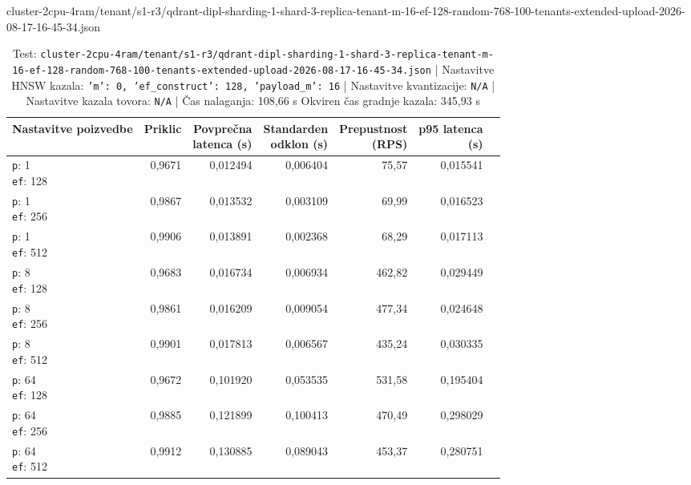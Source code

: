 \begin{table}[htbp]
  \centering
\small
  \caption{cluster-2cpu-4ram/tenant/s1-r3/qdrant-dipl-sharding-1-shard-3-replica-tenant-m-16-ef-128-random-768-100-tenants-extended-upload-2026-08-17-16-45-34.json}
  \label{tab:cluster-2cpu-4ram:tenant:s1-r3:qdrant-dipl-sharding-1-shard-3-replica-tenant-m-16-ef-128-random-768-100-tenants-extended-upload-2026-08-17-16-45-34.json}
  \begin{tabularx}{\textwidth}{Xrrrrrr}
    \toprule
    Nastavitve poizvedbe & Priklic & \makecell{Povprečna\\latenca (s)} & \makecell{Standarden\\odklon (s)} & \makecell{Prepustnost\\(RPS)} & \makecell{p95 latenca\\(s)}  \\
    \midrule
    \makecell{\texttt{p}: 1\\\texttt{ef}: 128} & 0,9671 & 0,012494 & 0,006404 & 75,57 & 0,015541 \\
    \makecell{\texttt{p}: 1\\\texttt{ef}: 256} & 0,9867 & 0,013532 & 0,003109 & 69,99 & 0,016523 \\
    \makecell{\texttt{p}: 1\\\texttt{ef}: 512} & 0,9906 & 0,013891 & 0,002368 & 68,29 & 0,017113 \\
    \makecell{\texttt{p}: 8\\\texttt{ef}: 128} & 0,9683 & 0,016734 & 0,006934 & 462,82 & 0,029449 \\
    \makecell{\texttt{p}: 8\\\texttt{ef}: 256} & 0,9861 & 0,016209 & 0,009054 & 477,34 & 0,024648 \\
    \makecell{\texttt{p}: 8\\\texttt{ef}: 512} & 0,9901 & 0,017813 & 0,006567 & 435,24 & 0,030335 \\
    \makecell{\texttt{p}: 64\\\texttt{ef}: 128} & 0,9672 & 0,101920 & 0,053535 & 531,58 & 0,195404 \\
    \makecell{\texttt{p}: 64\\\texttt{ef}: 256} & 0,9885 & 0,121899 & 0,100413 & 470,49 & 0,298029 \\
    \makecell{\texttt{p}: 64\\\texttt{ef}: 512} & 0,9912 & 0,130885 & 0,089043 & 453,37 & 0,280751 \\
    \bottomrule
  \end{tabularx}
\caption* {Test: \texttt{cluster-2cpu-4ram/tenant/s1-r3/qdrant-dipl-sharding-1-shard-3-replica-tenant-m-16-ef-128-random-768-100-tenants-extended-upload-2026-08-17-16-45-34.json} | Nastavitve HNSW kazala: \texttt{{'m': 0, 'ef\_construct': 128, 'payload\_m': 16}} | Nastavitve kvantizacije: \texttt{N/A} | Nastavitve kazala tovora: \texttt{N/A} | Čas nalaganja: 108,66 s Okviren čas gradnje kazala: 345,93 s}\end{table}


